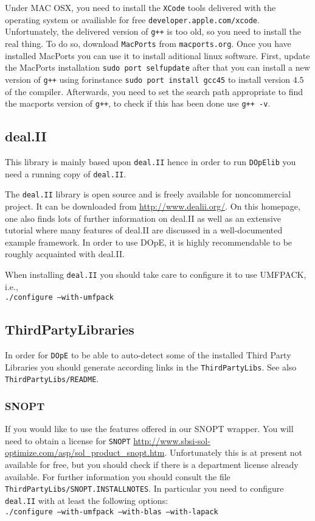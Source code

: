 Under MAC OSX, you need to install the \texttt{XCode} tools delivered with the operating system 
or availiable for free \texttt{developer.apple.com/xcode}. Unfortunately, the delivered 
version of \texttt{g++} is too old, so you need to install the real thing. To do so, 
download \texttt{MacPorts} from \texttt{macports.org}. Once you have installed MacPorts 
you can use it to install aditional linux software. 
First, update the MacPorts installation \texttt{sudo port selfupdate}
after that you can install a new version of \texttt{g++} using forinstance 
\texttt{sudo port install gcc45} to install version $4.5$ of the compiler.
Afterwards, you need to set the search path appropriate to find the macports version
of \texttt{g++}, to check if this has been done use \texttt{g++ -v}.

\subsection{deal.II}
This library is mainly based upon \texttt{deal.II} hence in order to run 
\texttt{DOpElib} you need a running copy of \texttt{deal.II}.

The \texttt{deal.II} library is open source and is freely available for noncommercial project.
It can be downloaded from \url{http://www.dealii.org/}. On this
homepage, one also finds lots of further information on deal.II as well as
an extensive tutorial where many features of deal.II are discussed in a
well-documented example framework. In order to use DOpE, it is highly
recommendable to be roughly acquainted with deal.II.

When installing \texttt{deal.II} you should take care to configure 
it to use UMFPACK, i.e.,\\
\texttt{./configure --with-umfpack}

\subsection{ThirdPartyLibraries}
In order for \texttt{DOpE} to be able to auto-detect some of the installed 
Third Party Libraries you should generate according links in the 
\texttt{ThirdPartyLibs}. See also \texttt{ThirdPartyLibs/README}.

\subsubsection{SNOPT}
If you would like to use the features offered in our SNOPT wrapper. You will 
need to obtain a license for \texttt{SNOPT} 
\url{http://www.sbsi-sol-optimize.com/asp/sol_product_snopt.htm}.
Unfortunately this is at present not available for free, but you should 
check if 
there is a department license already available.
For further information you should consult the file 
\texttt{ThirdPartyLibs/SNOPT.INSTALLNOTES}. In particular you need to configure 
\texttt{deal.II} with at least the following options:\\
\texttt{./configure --with-umfpack --with-blas --with-lapack}

